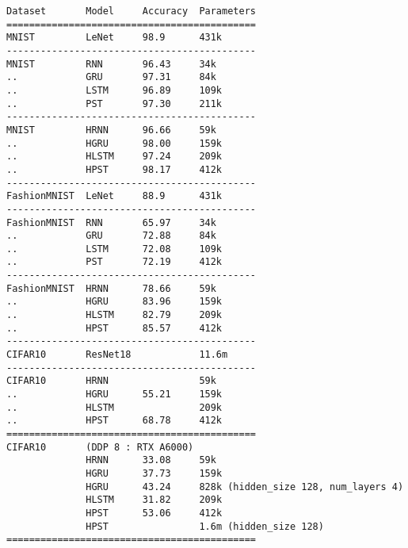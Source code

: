 \documentclass[10pt,twocolumn,letterpaper]{article}
\begin{document}
\begin{verbatim}
Dataset       Model     Accuracy  Parameters
============================================
MNIST         LeNet     98.9      431k
--------------------------------------------
MNIST         RNN       96.43     34k
..            GRU       97.31     84k
..            LSTM      96.89     109k
..            PST       97.30     211k
--------------------------------------------
MNIST         HRNN      96.66     59k
..            HGRU      98.00     159k
..            HLSTM     97.24     209k
..            HPST      98.17     412k
--------------------------------------------
FashionMNIST  LeNet     88.9      431k
--------------------------------------------
FashionMNIST  RNN       65.97     34k
..            GRU       72.88     84k
..            LSTM      72.08     109k
..            PST       72.19     412k
--------------------------------------------
FashionMNIST  HRNN      78.66     59k
..            HGRU      83.96     159k
..            HLSTM     82.79     209k
..            HPST      85.57     412k
--------------------------------------------
CIFAR10       ResNet18            11.6m
--------------------------------------------
CIFAR10       HRNN                59k
..            HGRU      55.21     159k
..            HLSTM               209k
..            HPST      68.78     412k
============================================
CIFAR10       (DDP 8 : RTX A6000)
              HRNN      33.08     59k
              HGRU      37.73     159k
              HGRU      43.24     828k (hidden_size 128, num_layers 4)
              HLSTM     31.82     209k
              HPST      53.06     412k
              HPST                1.6m (hidden_size 128)
============================================
\end{verbatim}


{\small


}
\end{document}
